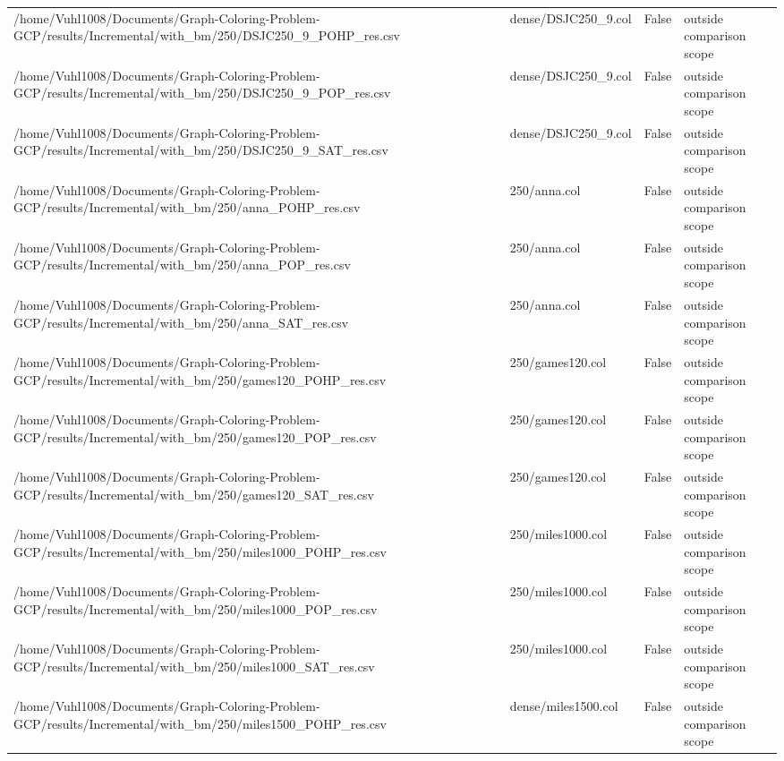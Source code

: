 \begin{table}[htbp]
\begin{tabular}{llll}
/home/Vuhl1008/Documents/Graph-Coloring-Problem-GCP/results/Incremental/with\_bm/250/DSJC250\_9\_POHP\_res.csv & dense/DSJC250\_9.col & False & outside comparison scope \\
/home/Vuhl1008/Documents/Graph-Coloring-Problem-GCP/results/Incremental/with\_bm/250/DSJC250\_9\_POP\_res.csv & dense/DSJC250\_9.col & False & outside comparison scope \\
/home/Vuhl1008/Documents/Graph-Coloring-Problem-GCP/results/Incremental/with\_bm/250/DSJC250\_9\_SAT\_res.csv & dense/DSJC250\_9.col & False & outside comparison scope \\
/home/Vuhl1008/Documents/Graph-Coloring-Problem-GCP/results/Incremental/with\_bm/250/anna\_POHP\_res.csv & 250/anna.col & False & outside comparison scope \\
/home/Vuhl1008/Documents/Graph-Coloring-Problem-GCP/results/Incremental/with\_bm/250/anna\_POP\_res.csv & 250/anna.col & False & outside comparison scope \\
/home/Vuhl1008/Documents/Graph-Coloring-Problem-GCP/results/Incremental/with\_bm/250/anna\_SAT\_res.csv & 250/anna.col & False & outside comparison scope \\
/home/Vuhl1008/Documents/Graph-Coloring-Problem-GCP/results/Incremental/with\_bm/250/games120\_POHP\_res.csv & 250/games120.col & False & outside comparison scope \\
/home/Vuhl1008/Documents/Graph-Coloring-Problem-GCP/results/Incremental/with\_bm/250/games120\_POP\_res.csv & 250/games120.col & False & outside comparison scope \\
/home/Vuhl1008/Documents/Graph-Coloring-Problem-GCP/results/Incremental/with\_bm/250/games120\_SAT\_res.csv & 250/games120.col & False & outside comparison scope \\
/home/Vuhl1008/Documents/Graph-Coloring-Problem-GCP/results/Incremental/with\_bm/250/miles1000\_POHP\_res.csv & 250/miles1000.col & False & outside comparison scope \\
/home/Vuhl1008/Documents/Graph-Coloring-Problem-GCP/results/Incremental/with\_bm/250/miles1000\_POP\_res.csv & 250/miles1000.col & False & outside comparison scope \\
/home/Vuhl1008/Documents/Graph-Coloring-Problem-GCP/results/Incremental/with\_bm/250/miles1000\_SAT\_res.csv & 250/miles1000.col & False & outside comparison scope \\
/home/Vuhl1008/Documents/Graph-Coloring-Problem-GCP/results/Incremental/with\_bm/250/miles1500\_POHP\_res.csv & dense/miles1500.col & False & outside comparison scope \\

\end{tabular}
\end{table}
